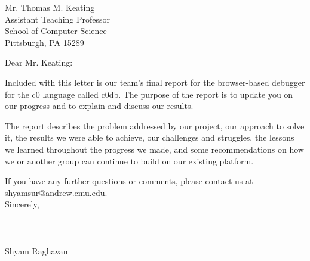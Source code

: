 \documentclass[11pt,stdletter,sigleft]{letter}
\begin{document}
\begin{letter}{Mr. Thomas M. Keating \\
    Assistant Teaching Professor \\
    School of Computer Science \\
    Pittsburgh, PA 15289}

\opening{Dear Mr. Keating:}
\vspace{5mm}

Included with this letter is our team's final report for the browser-based
debugger for the c0 language called c0db. The purpose of the report is to
update you on our progress and to explain and discuss our results.

The report describes the problem addressed by our project, our approach to
solve it, the results we were able to achieve, our challenges and struggles,
the lessons we learned throughout the progress we made, and some
recommendations on how we or another group can continue to build on our
existing platform.

If you have any further questions or comments, please contact us at
shyamsur@andrew.cmu.edu.\\

Sincerely,\\\\\\\\
Shyam Raghavan


\end{letter}
\end{document}
